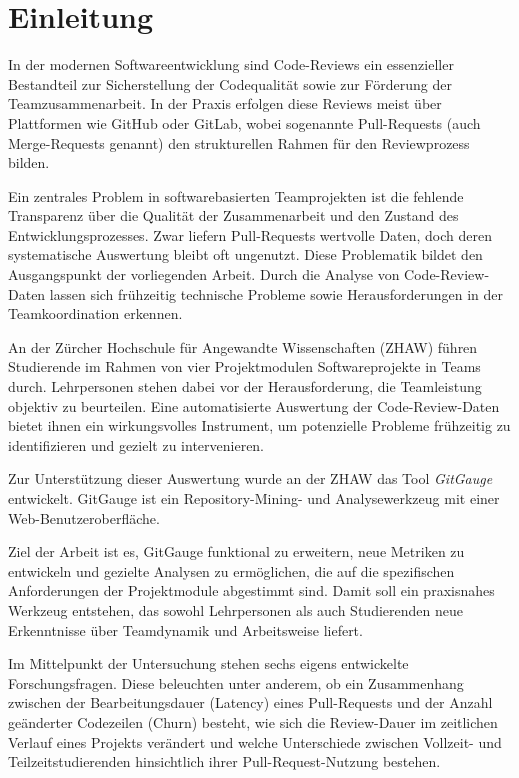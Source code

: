 


\chapter{Einleitung} %
In der modernen Softwareentwicklung sind Code-Reviews ein essenzieller Bestandteil zur Sicherstellung der Codequalität sowie zur Förderung der Teamzusammenarbeit. In der Praxis erfolgen diese Reviews meist über Plattformen wie GitHub oder GitLab, wobei sogenannte Pull-Requests (auch Merge-Requests genannt) den strukturellen Rahmen für den Reviewprozess bilden.

Ein zentrales Problem in softwarebasierten Teamprojekten ist die fehlende Transparenz über die Qualität der Zusammenarbeit und den Zustand des Entwicklungsprozesses. Zwar liefern Pull-Requests wertvolle Daten, doch deren systematische Auswertung bleibt oft ungenutzt. Diese Problematik bildet den Ausgangspunkt der vorliegenden Arbeit. Durch die Analyse von Code-Review-Daten lassen sich frühzeitig technische Probleme sowie Herausforderungen in der Teamkoordination erkennen.

An der Zürcher Hochschule für Angewandte Wissenschaften (ZHAW) führen Studierende im Rahmen von vier Projektmodulen Softwareprojekte in Teams durch. Lehrpersonen stehen dabei vor der Herausforderung, die Teamleistung objektiv zu beurteilen. Eine automatisierte Auswertung der Code-Review-Daten bietet ihnen ein wirkungsvolles Instrument, um potenzielle Probleme frühzeitig zu identifizieren und gezielt zu intervenieren.

Zur Unterstützung dieser Auswertung wurde an der ZHAW das Tool \textit{GitGauge} entwickelt. GitGauge ist ein Repository-Mining- und Analysewerkzeug mit einer Web-Benutzeroberfläche.

Ziel der Arbeit ist es, GitGauge funktional zu erweitern, neue Metriken zu entwickeln und gezielte Analysen zu ermöglichen, die auf die spezifischen Anforderungen der Projektmodule abgestimmt sind. Damit soll ein praxisnahes Werkzeug entstehen, das sowohl Lehrpersonen als auch Studierenden neue Erkenntnisse über Teamdynamik und Arbeitsweise liefert.

Im Mittelpunkt der Untersuchung stehen sechs eigens entwickelte Forschungsfragen. Diese beleuchten unter anderem, ob ein Zusammenhang zwischen der Bearbeitungsdauer (Latency) eines Pull-Requests und der Anzahl geänderter Codezeilen (Churn) besteht, wie sich die Review-Dauer im zeitlichen Verlauf eines Projekts verändert und welche Unterschiede zwischen Vollzeit- und Teilzeitstudierenden hinsichtlich ihrer Pull-Request-Nutzung bestehen.

